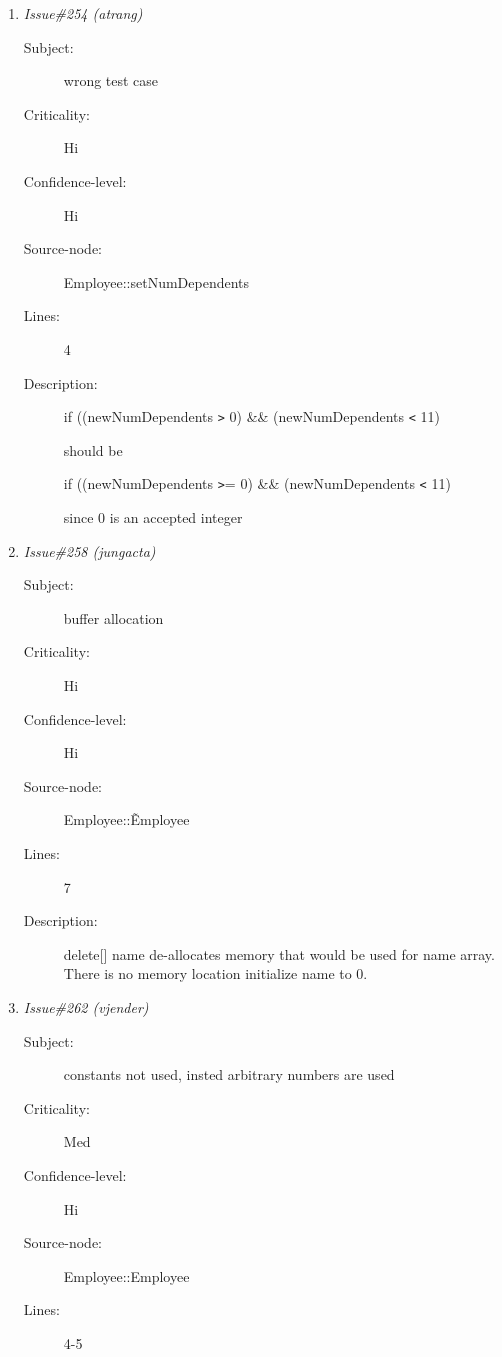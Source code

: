 \begin{enumerate}
\begin{description}
\item [Lines:] 8

\item [Description:] same as issue \# 246 or line 7
\end{description}
\item {\it Issue\#254 (atrang)}
\begin{description}
\item [Subject:] wrong test case
\item [Criticality:] Hi
\item [Confidence-level:] Hi
\item [Source-node:] Employee::setNumDependents

\item [Lines:] 4

\item [Description:] if ((newNumDependents {\tt >} 0) \&\& (newNumDependents {\tt <} 11)

should be

if ((newNumDependents {\tt >}= 0) \&\& (newNumDependents {\tt <} 11)

since 0 is an accepted integer
\end{description}
\item {\it Issue\#258 (jungacta)}
\begin{description}
\item [Subject:] buffer allocation
\item [Criticality:] Hi
\item [Confidence-level:] Hi
\item [Source-node:] Employee::\~Employee

\item [Lines:] 7

\item [Description:] delete[] name de-allocates memory that would
be used for name array. There is no memory location initialize name to 0.
\end{description}
\item {\it Issue\#262 (vjender)}
\begin{description}
\item [Subject:] constants not used, insted arbitrary numbers are
used
\item [Criticality:] Med
\item [Confidence-level:] Hi
\item [Source-node:] Employee::Employee

\item [Lines:] 4-5


\end{description}
\end{enumerate}

